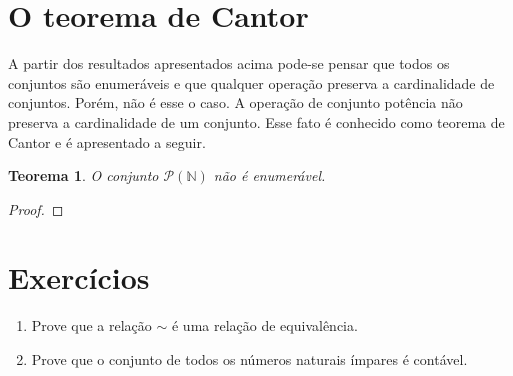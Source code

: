 \documentclass[a4paper]{article}
\newtheorem{Theorem}{Teorema}
\theoremstyle{definition}
\begin{document}
  \section{O teorema de Cantor}

  A partir dos resultados apresentados acima pode-se pensar que todos os
  conjuntos são enumeráveis e que qualquer operação preserva a cardinalidade
  de conjuntos. Porém, não é esse o caso. A operação de conjunto potência não
  preserva a cardinalidade de um conjunto. Esse fato é conhecido como teorema
  de Cantor e é apresentado a seguir.

  \begin{Theorem}
    O conjunto $\mathcal{P}(\mathbb{N})$ não é enumerável.
  \end{Theorem}
  \begin{proof}
    
  \end{proof}
  \section{Exercícios}

  \begin{enumerate}
    \item Prove que a relação $\sim$ é uma relação de equivalência.
    \item Prove que o conjunto de todos os números naturais ímpares é contável.
  \end{enumerate}
\end{document}
